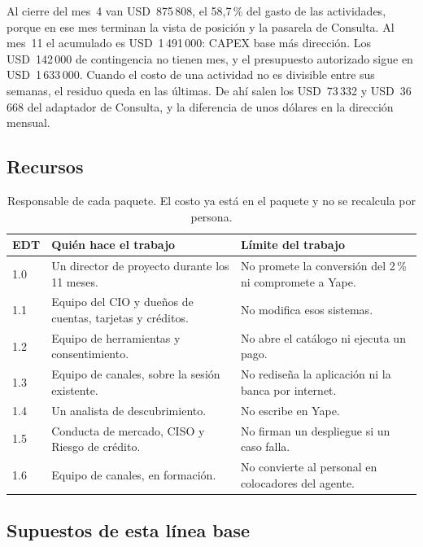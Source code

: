 \documentclass[11pt,a4paper]{article}
\newcommand{\usd}[1]{USD~#1}
\begin{document}
Al cierre del mes~4 van \usd{875\,808}, el 58,7\,\% del gasto de las actividades, porque en ese mes terminan la vista de posición y la pasarela de Consulta. Al mes~11 el acumulado es \usd{1\,491\,000}: CAPEX base más dirección. Los \usd{142\,000} de contingencia no tienen mes, y el presupuesto autorizado sigue en \usd{1\,633\,000}. Cuando el costo de una actividad no es divisible entre sus semanas, el residuo queda en las últimas. De ahí salen los \usd{73\,332} y \usd{36\,668} del adaptador de Consulta, y la diferencia de unos dólares en la dirección mensual.

\subsection{Recursos}

\begin{table}[H]
\centering
\caption{Responsable de cada paquete. El costo ya está en el paquete y no se recalcula por persona.}
\small
\begin{tabularx}{\textwidth}{@{}l X X@{}}
\toprule
\textbf{EDT} & \textbf{Quién hace el trabajo} & \textbf{Límite del trabajo} \\
\midrule
1.0 & Un director de proyecto durante los 11 meses. & No promete la conversión del 2\,\% ni compromete a Yape. \\
1.1 & Equipo del CIO y dueños de cuentas, tarjetas y créditos. & No modifica esos sistemas. \\
1.2 & Equipo de herramientas y consentimiento. & No abre el catálogo ni ejecuta un pago. \\
1.3 & Equipo de canales, sobre la sesión existente. & No rediseña la aplicación ni la banca por internet. \\
1.4 & Un analista de descubrimiento. & No escribe en Yape. \\
1.5 & Conducta de mercado, CISO y Riesgo de crédito. & No firman un despliegue si un caso falla. \\
1.6 & Equipo de canales, en formación. & No convierte al personal en colocadores del agente. \\
\bottomrule
\end{tabularx}
\end{table}

\subsection{Supuestos de esta línea base}
\end{document}
